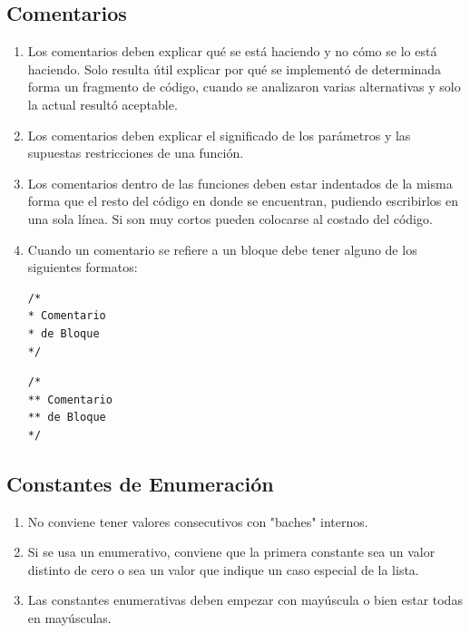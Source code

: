 \documentclass{article}
\begin{document}
\subsection{Comentarios}
\begin{enumerate}
    \item Los comentarios deben explicar qué se está haciendo y no cómo se lo está haciendo. 
    Solo resulta útil explicar por qué se implementó de determinada forma un fragmento de código, cuando se analizaron varias alternativas y solo la actual resultó aceptable.
    \item Los comentarios deben explicar el significado de los parámetros y las supuestas restricciones de una función.
    \item Los comentarios dentro de las funciones deben estar indentados de la misma forma que el resto del código en donde se encuentran, pudiendo escribirlos en una sola línea.
    Si son muy cortos pueden colocarse al costado del código.
    \item Cuando un comentario se refiere a un bloque debe tener alguno de los siguientes formatos:
    \\\begin{minipage}{.45\textwidth}
    \begin{lstlisting}
/*
* Comentario
* de Bloque
*/
    \end{lstlisting}
    \end{minipage}\hfill
    \begin{minipage}{.45\textwidth}
    \begin{lstlisting}
/*
** Comentario
** de Bloque
*/
    \end{lstlisting}
    \end{minipage}
\end{enumerate}

\subsection{Constantes de Enumeración}
\begin{enumerate}
    \item No conviene tener valores consecutivos con "baches" internos.
    \item Si se usa un enumerativo, conviene que la primera constante sea un valor distinto de cero o sea un valor que indique un caso especial de la lista.
    \item Las constantes enumerativas deben empezar con mayúscula o bien estar todas en mayúsculas.
\end{enumerate}
\end{document}

